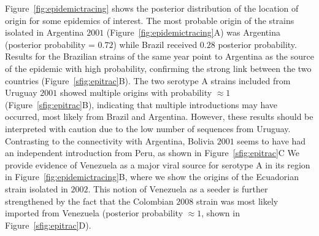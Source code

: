 \documentclass[10pt]{article}
\begin{document}
Figure~\ref{fig:epidemictracing} shows the posterior distribution of the location of origin for some epidemics of interest.
The most probable origin of the strains isolated in Argentina $2001$ (Figure~\ref{fig:epidemictracing}A) was Argentina (posterior probability = $0.72$) while Brazil received $0.28$ posterior probability.
Results for the Brazilian strains of the same year point to Argentina as the source of the epidemic with high probability, confirming the strong link between the two countries (Figure~\ref{sfig:epitrac}B).
The two serotype A strains included from Uruguay $2001$ showed multiple origins with probability $\approx 1$ (Figure~\ref{sfig:epitrac}B), indicating that multiple introductions may have occurred, most likely from Brazil and Argentina.
However, these results should be interpreted with caution due to the low number of sequences from Uruguay.
Contrasting to the connectivity with Argentina, Bolivia $2001$ seems to have had an independent introduction from Peru, as shown in Figure~\ref{sfig:epitrac}C
We provide evidence of Venezuela as a major viral source for serotype A in its region in Figure~\ref{fig:epidemictracing}B, where we show the origins of the Ecuadorian strain isolated in $2002$.
This notion of Venezuela as a seeder is further strengthened by the fact that the Colombian $2008$ strain was most likely imported from Venezuela (posterior probability $\approx 1$, shown in Figure~\ref{sfig:epitrac}D).
\end{document}
